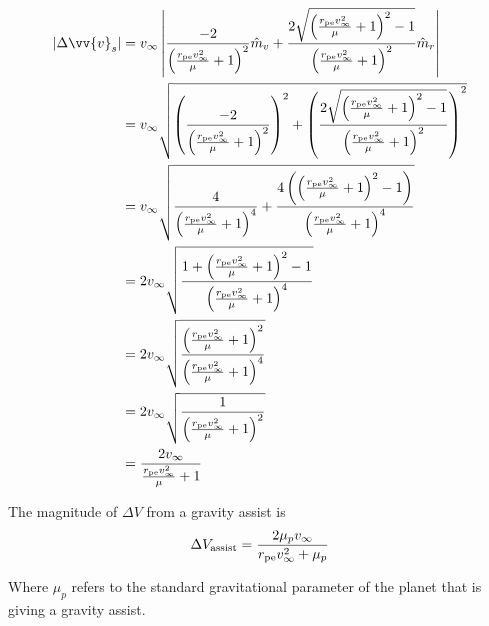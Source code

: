 \documentclass[../main.tex]{subfiles}
\begin{document}
\begin{align*}
    |\Delta\vv{v}_s| & = v_\infty\left|\frac{-2}{\left(\frac{r_\text{pe}v_\infty^2}{\mu}+1\right)^2}\hat{m}_v+\frac{2\sqrt{\left(\frac{r_\text{pe}v_\infty^2}{\mu}+1\right)^2-1}}{\left(\frac{r_\text{pe}v_\infty^2}{\mu}+1\right)^2}\hat{m}_r\right|       \\
                     & = v_\infty\sqrt{\left(\frac{-2}{\left(\frac{r_\text{pe}v_\infty^2}{\mu}+1\right)^2}\right)^2+\left(\frac{2\sqrt{\left(\frac{r_\text{pe}v_\infty^2}{\mu}+1\right)^2-1}}{\left(\frac{r_\text{pe}v_\infty^2}{\mu}+1\right)^2}\right)^2} \\
                     & = v_\infty\sqrt{\frac{4}{\left(\frac{r_\text{pe}v_\infty^2}{\mu}+1\right)^4}+\frac{4\left(\left(\frac{r_\text{pe}v_\infty^2}{\mu}+1\right)^2-1\right)}{\left(\frac{r_\text{pe}v_\infty^2}{\mu}+1\right)^4}}                          \\
                     & = 2v_\infty\sqrt{\frac{1+\left(\frac{r_\text{pe}v_\infty^2}{\mu}+1\right)^2-1}{\left(\frac{r_\text{pe}v_\infty^2}{\mu}+1\right)^4}}                                                                                                  \\
                     & = 2v_\infty\sqrt{\frac{\left(\frac{r_\text{pe}v_\infty^2}{\mu}+1\right)^2}{\left(\frac{r_\text{pe}v_\infty^2}{\mu}+1\right)^4}}                                                                                                      \\
                     & = 2v_\infty\sqrt{\frac{1}{\left(\frac{r_\text{pe}v_\infty^2}{\mu}+1\right)^2}}                                                                                                                                                       \\
                     & = \frac{2v_\infty}{\frac{r_\text{pe}v_\infty^2}{\mu}+1}                                                                                                                                                                              \\
\end{align*}

The magnitude of $\Delta V$ from a gravity assist is
\begin{equation}\label{Gravity Assist Delta V}
    \Delta V_\text{assist}=\frac{2\mu_p v_\infty}{r_\text{pe}v_\infty^2+\mu_p}\\
\end{equation}

Where $\mu_p$ refers to the standard gravitational parameter of the planet that is giving a gravity assist.
\end{document}
